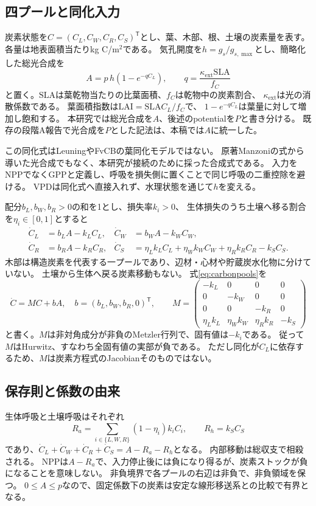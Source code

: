\documentclass[a4paper,11pt]{ltjsarticle}
\newcommand{\tr}{^{\mathsf T}}
\begin{document}
\subsection{四プールと同化入力}
炭素状態を$C=(C_L,C_W,C_R,C_S)\tr$とし、葉、木部、根、土壌の炭素量を表す。
各量は地表面積当たりkg C/m$^2$である。
気孔開度を$h=g_s/g_{s,\max}$とし、簡略化した総光合成を
\begin{equation}\label{eq:gpp}
 A=p\,h(1-e^{-qC_L}),\qquad q=\frac{\kappa_{\mathrm{ext}}\mathrm{SLA}}{f_C}
\end{equation}
と置く。$\mathrm{SLA}$は葉乾物当たりの比葉面積、$f_C$は乾物中の炭素割合、
$\kappa_{\mathrm{ext}}$は光の消散係数である。
葉面積指数は$\mathrm{LAI}=\mathrm{SLA}C_L/f_C$で、
$1-e^{-qC_L}$は葉量に対して増加し飽和する。
本研究では総光合成を$A$、後述のpotentialを$P$と書き分ける。
既存の段階A報告で光合成を$P$とした記法は、本稿では$A$に統一した。

この同化式はLeuningやFvCBの葉同化モデルではない。
原著Manzoniの式から導いた光合成でもなく、本研究が接続のために採った合成式である。
入力をNPPでなくGPPと定義し、呼吸を損失側に置くことで同じ呼吸の二重控除を避ける。
VPDは同化式へ直接入れず、水理状態を通じて$h$を変える。

配分$b_L,b_W,b_R>0$の和を1とし、損失率$k_i>0$、
生体損失のうち土壌へ移る割合を$\eta_i\in[0,1]$とすると
\begin{align}
 \dot C_L&=b_LA-k_LC_L,&\dot C_W&=b_WA-k_WC_W,\nonumber\\
 \dot C_R&=b_RA-k_RC_R,&
 \dot C_S&=\eta_Lk_LC_L+\eta_Wk_WC_W+\eta_Rk_RC_R-k_SC_S.
 \label{eq:carbonpools}
\end{align}
木部は構造炭素を代表する一プールであり、辺材・心材や貯蔵炭水化物に分けていない。
土壌から生体へ戻る炭素移動もない。
式\eqref{eq:carbonpools}を
\begin{equation}\label{eq:matrix}
 \dot C=MC+bA,\quad b=(b_L,b_W,b_R,0)\tr,\qquad
 M=\begin{pmatrix}
 -k_L&0&0&0\\0&-k_W&0&0\\0&0&-k_R&0\\
 \eta_Lk_L&\eta_Wk_W&\eta_Rk_R&-k_S
 \end{pmatrix}
\end{equation}
と書く。$M$は非対角成分が非負のMetzler行列で、固有値は$-k_i$である。
従って$M$はHurwitz、すなわち全固有値の実部が負である。
ただし同化が$C_L$に依存するため、$M$は炭素方程式のJacobianそのものではない。

\subsection{保存則と係数の由来}
生体呼吸と土壌呼吸はそれぞれ
\begin{equation}
 R_a=\sum_{i\in\{L,W,R\}}(1-\eta_i)k_iC_i,\qquad R_h=k_SC_S
\end{equation}
であり、$\dot C_L+\dot C_W+\dot C_R+\dot C_S=A-R_a-R_h$となる。
内部移動は総収支で相殺される。
NPPは$A-R_a$で、入力停止後には負になり得るが、炭素ストックが負になることを意味しない。
非負境界で各プールの右辺は非負で、非負領域を保つ。
$0\le A\le p$なので、固定係数下の炭素は安定な線形移送系との比較で有界となる。
\end{document}
